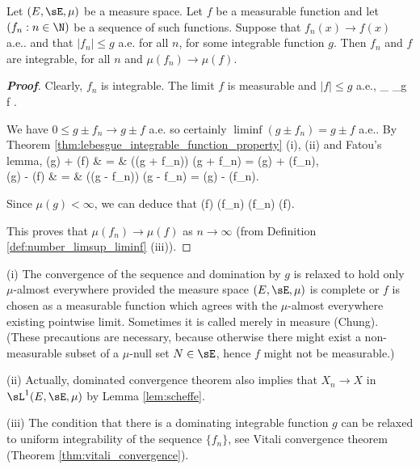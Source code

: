 \begin{theorem}\label{thm:dominated_convergence_measure}
Let $(E,\sE,\mu)$ be a measure space. Let $f$ be a measurable function and let $(f_n : n \in \N)$ be a sequence of such functions. Suppose that $f_n(x) \to f(x)$ a.e.. and that $|f_n| \leq g$ a.e. for all $n$, for some integrable function $g$. Then $f_n$ and $f$ are integrable, for all $n$ and $\mu(f_n) \to \mu(f)$.
\end{theorem}
\begin{proof}[\bf Proof]
Clearly, $f_n$ is integrable. The limit $f$ is measurable and $|f| \leq g$ a.e.,
\be
{}_{} \underbrace{<\quad\infty}_{g }\quad\ra\quad f .
\ee

We have $0 \leq g \pm f_n \to g \pm f$ a.e. so certainly $\liminf(g \pm f_n) = g \pm f$ a.e.. By Theorem \ref{thm:lebesgue_integrable_function_property} (i), (ii) and Fatou's lemma,
\beast
\mu(g) + \mu(f) & = & \mu(\liminf(g + f_n)) \leq \liminf \mu(g + f_n) = \mu(g) + \liminf \mu(f_n),\\
\mu(g) - \mu(f) & = & \mu(\liminf(g - f_n)) \leq \liminf \mu(g - f_n) = \mu(g) - \limsup \mu(f_n).
\eeast

Since $\mu(g) < \infty$, we can deduce that
\be
\mu(f) \leq \liminf \mu(f_n) \leq \limsup \mu(f_n) \leq \mu(f).
\ee

This proves that $\mu(f_n) \to \mu(f)$ as $n \to \infty$ (from Definition \ref{def:number_limsup_liminf} (iii)).
\end{proof}

\begin{remark}
\ben
\item [(i)] The convergence of the sequence and domination by $g$ is relaxed to hold only $\mu$-almost everywhere provided the measure space $(E, \sE, \mu)$ is complete or $f$ is chosen as a measurable function which agrees with the $\mu$-almost everywhere existing pointwise limit. Sometimes it is called merely in measure (Chung\cite{Chung_2000}). (These precautions are necessary, because otherwise there might exist a non-measurable subset of a $\mu$-null set $N \in \sE$, hence $f$ might not be measurable.)
\item [(ii)] Actually, dominated convergence theorem also implies that $X_n \to X$ in $\sL^1(E,\sE,\mu)$ by Lemma \ref{lem:scheffe}.
\item [(iii)] The condition that there is a dominating integrable function $g$ can be relaxed to uniform integrability of the sequence $\{f_n\}$, see Vitali convergence theorem (Theorem \ref{thm:vitali_convergence}).
\een
\end{remark}

